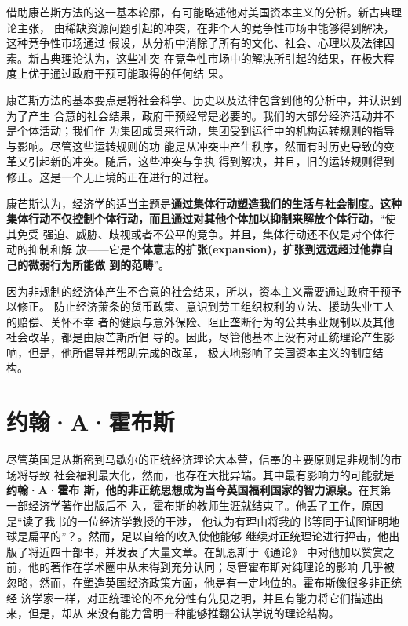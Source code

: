 借助康芒斯方法的这一基本轮廓，有可能略述他对美国资本主义的分析。新古典理论主张，
由稀缺资源问题引起的冲突，在非个人的竞争性市场中能够得到解决，这种竞争性市场通过
假设，从分析中消除了所有的文化、社会、心理以及法律因素。新古典理论认为，这些冲突
在竞争性市场中的解决所引起的结果，在极大程度上优于通过政府干预可能取得的任何结
果。

康芒斯方法的基本要点是将社会科学、历史以及法律包含到他的分析中，并认识到为了产生
合意的社会结果，政府干预经常是必要的。我们的大部分经济活动并不是个体活动；我们作
为集团成员来行动，集团受到运行中的机构运转规则的指导与影响。尽管这些运转规则的功
能是从冲突中产生秩序，然而有时历史导致的变革又引起新的冲突。随后，这些冲突与争执
得到解决，并且，旧的运转规则得到修正。这是一个无止境的正在进行的过程。

康芒斯认为，经济学的适当主题是\textbf{通过集体行动塑造我们的生活与社会制度。这种
  集体行动不仅控制个体行动，而且通过对其他个体加以抑制来解放个体行动}，“使其免受
强迫、威胁、歧视或者不公平的竞争。并且，集体行动还不仅是对个体行动的抑制和解
放——它是\textbf{个体意志的扩张(expansion)，扩张到远远超过他靠自己的微弱行为所能做
  到的范畴}”。

因为非规制的经济体产生不合意的社会结果，所以，资本主义需要通过政府干预予以修正。
防止经济萧条的货币政策、意识到劳工组织权利的立法、援助失业工人的赔偿、关怀不幸
者的健康与意外保险、阻止垄断行为的公共事业规制以及其他社会改革，都是由康芒斯所倡
导的。因此，尽管他基本上没有对正统理论产生影响，但是，他所倡导并帮助完成的改革，
极大地影响了美国资本主义的制度结构。

\section{约翰·A·霍布斯}

尽管英国是从斯密到马歇尔的正统经济理论大本营，信奉的主要原则是非规制的市场将导致
社会福利最大化，然而，也存在大批异端。其中最有影响力的可能就是\textbf{约翰·A·霍布
  斯，他的非正统思想成为当今英国福利国家的智力源泉。}在其第一部经济学著作出版后不
入，霍布斯的教师生涯就结束了。他丢了工作，原因是“读了我书的一位经济学教授的干涉，
他认为有理由将我的书等同于试图证明地球是扁平的”？。然而，足以自给的收入使他能够
继续对正统理论进行抨击，他出版了将近四十部书，并发表了大量文章。在凯恩斯于《通论》
中对他加以赞赏之前，他的著作在学术圈中从未得到充分认同；尽管霍布斯对纯理论的影响
几乎被忽略，然而，在塑造英国经济政策方面，他是有一定地位的。霍布斯像很多非正统经
济学家一样，对正统理论的不充分性有先见之明，并且有能力将它们描述出来，但是，却从
来没有能力曾明一种能够推翻公认学说的理论结构。

